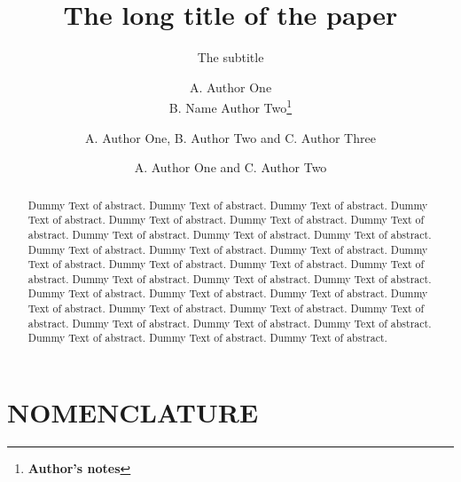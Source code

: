 \documentclass{isabec} %
\begin{document}

\title{The long title of the paper}
\subtitle{The subtitle}

\author{A. Author One\\ B. Name Author Two\thanks{{\bf Author's notes}}}

\author{A. Author One, B. Author Two and C. Author Three}
\author{A. Author One and C. Author Two}

\maketitle                   

\begin{abstract}
Dummy Text of abstract. Dummy Text of abstract. Dummy Text of abstract. Dummy Text of abstract. Dummy Text of abstract. Dummy Text of abstract. Dummy Text of abstract. Dummy Text of abstract. Dummy Text of abstract. Dummy Text of abstract. Dummy Text of abstract. Dummy Text of abstract. Dummy Text of abstract. Dummy Text of abstract. Dummy Text of abstract. Dummy Text of abstract. Dummy Text of abstract. Dummy Text of abstract. Dummy Text of abstract. Dummy Text of abstract. Dummy Text of abstract. Dummy Text of abstract. Dummy Text of abstract. Dummy Text of abstract. Dummy Text of abstract. Dummy Text of abstract. Dummy Text of abstract. Dummy Text of abstract. Dummy Text of abstract. Dummy Text of abstract. Dummy Text of abstract. Dummy Text of abstract. Dummy Text of abstract.
\end{abstract}

\section*{NOMENCLATURE} %
\begin{deflist}%
\end{deflist}
\end{document}
